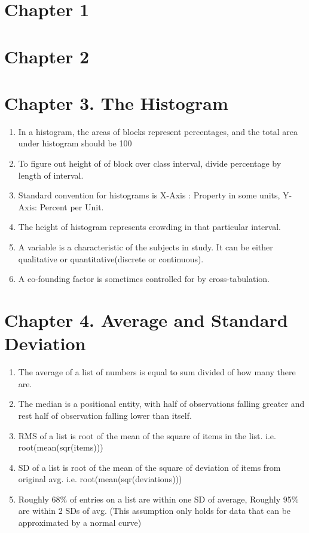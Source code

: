 \documentclass[10pt,a4paper]{article}
\begin{document}
	\section{Chapter 1}
	\section{Chapter 2}
	\section{Chapter 3. The Histogram}
	
	\begin{enumerate}
		\item In a histogram, the areas of blocks represent percentages, and the total area under histogram should be 100%
		\item To figure out height of of block over class interval, divide percentage by length of interval.
		\item Standard convention for histograms is X-Axis : Property in some units, Y-Axis: Percent per Unit.
		\item The height of histogram represents crowding in that particular interval.
		\item A variable is a characteristic of the subjects in study. It can be either qualitative or quantitative(discrete or continuous).
		\item A co-founding factor is sometimes controlled for by cross-tabulation.	
	\end{enumerate}
	
	\section{Chapter 4. Average and Standard Deviation}
	
	\begin{enumerate}
		\item The average of a list of numbers is equal to sum divided of how many there are.
		\item The median is a positional entity, with half of observations falling greater and rest half of observation falling lower than itself.
		\item RMS of a list is root of the mean of the square of items in the list. i.e. root(mean(sqr(items)))
		\item SD of a list is root of the mean of the square of deviation of items from original avg. i.e. root(mean(sqr(deviations)))
		\item Roughly 68\% of entries on a list are within one SD of average, Roughly 95\% are within 2 SDs of avg. (This assumption only holds for data that can be approximated by a normal curve)
		
	\end{enumerate}
	
\end{document}
